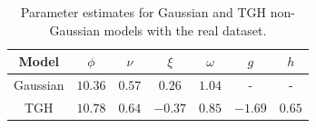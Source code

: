 \documentclass[conference]{IEEEtran}
\begin{document}
\begin{table}
\begin{center}
\begin{tabular}{ |c|c|c|c|c|c|c| } 
 \hline
 Model & $\phi$ & $\nu$ & $\xi$ & $\omega$& $g$ & $h$  \\
 \hline 
Gaussian & $10.36$ & $0.57$ & $0.26$ & $1.04$ & -  & -   \\
 \hline
 TGH & $10.78$ & $0.64$ & $-0.37$ & $0.85$ & $-1.69$ & $0.65$ \\
 \hline
 \end{tabular}
\end{center}
\caption{Parameter estimates for Gaussian and TGH non-Gaussian models with the real dataset.}
\label{table:estimates}
\end{table}

\end{document}

